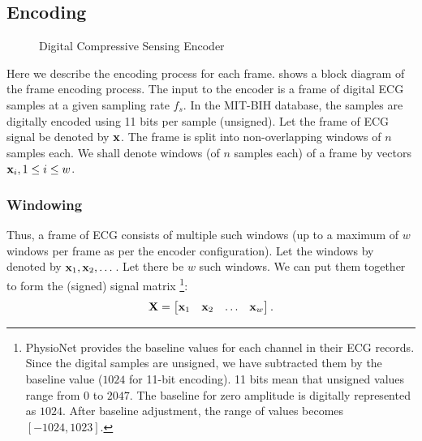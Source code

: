 


\subsection{Encoding}
\begin{figure}[!ht]
\centering 

\caption{Digital Compressive Sensing Encoder}
\label{fig:cs:encoder}
\end{figure}


\begin{figure}[!t]
 \removelatexerror
 \centering

\end{figure}

Here we describe the encoding process for each frame.
 shows a block diagram of the frame encoding process.
The input to the encoder is a frame of digital ECG samples
at a given sampling rate $f_s$. In the MIT-BIH database,
the samples are digitally encoded using 11 bits per sample (unsigned).
Let the frame of ECG signal be denoted by $\mathbf{x}$.
The frame is split into non-overlapping windows of $n$
samples each. We shall denote windows (of $n$ samples each) of a frame
by vectors $\mathbf{x}_i, 1 \le i\le w$.

\subsubsection{Windowing}
Thus, a frame of ECG consists of multiple
such windows (up to a maximum of $w$ windows per
frame as per the encoder configuration).
Let the windows by denoted by $\mathbf{x}_1, \mathbf{x}_2, \dots$.
Let there be $w$ such windows.
We can put them together to form the (signed) signal matrix
\footnote{
PhysioNet provides the baseline values for each channel
in their ECG records.
Since the digital samples are unsigned, we have subtracted
them by the baseline value ($1024$ for 11-bit encoding).
11 bits mean that unsigned values range from
$0$ to $2047$. The baseline for zero amplitude is
digitally represented as $1024$.
After baseline adjustment, the range of values becomes
$[-1024,1023]$.
}:
\begin{equation}
\mathbf{X} = \begin{bmatrix}
\mathbf{x}_1 & \mathbf{x}_2 & \dots & \mathbf{x}_w
\end{bmatrix}.
\end{equation}

